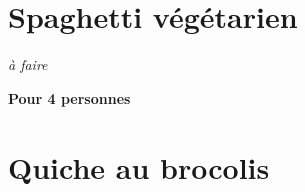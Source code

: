 \documentclass[10pt,a4paper]{report}
\begin{document}
    \section{Spaghetti végétarien}

    \begin{multicols}{2}
        \parbox[1cm]{\textwidth}{
            \begin{description}
                \item \textit{à faire}
            \end{description}
        }
        \columnbreak

        \textbf{Pour 4 personnes}
    \end{multicols}
    \newpage

    \section{Quiche au brocolis}
\end{document}
